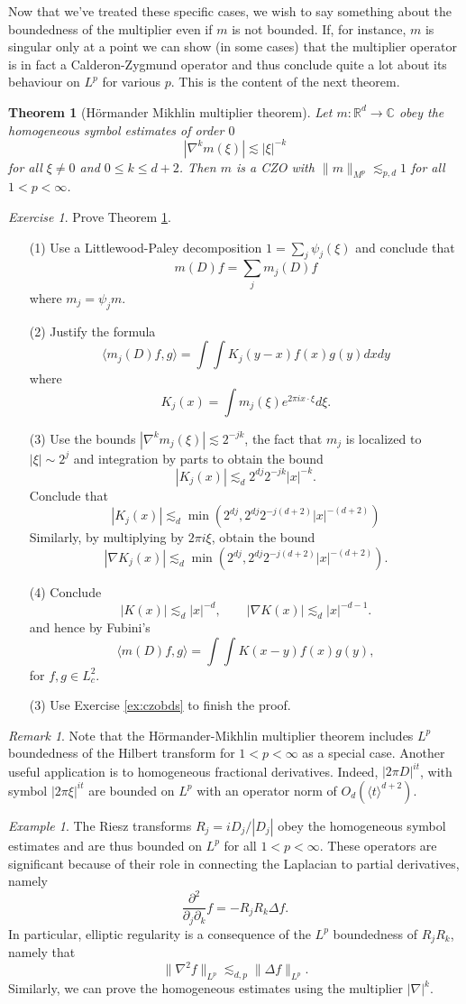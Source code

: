 \documentclass[11pt]{article}
\newtheorem{thm}{Theorem}
\theoremstyle{remark}
\newtheorem{exr}{Exercise}
\newtheorem*{ex}{Example}
\newtheorem*{rmk}{Remark}
\newcommand{\1}{\textbf{1}}
\newcommand{\lle}{\lesssim}
\def\norm#1{\| #1  \|}
\def\brac#1{\langle #1  \rangle}
\newcommand{\bbR}{\mathbb{R}}
\newcommand{\bbC}{\mathbb{C}}
\begin{document}
Now that we've treated these specific cases, we wish to say something about the boundedness of the multiplier even if $m$ is not bounded. If, for instance, $m$ is singular only at a point we can show (in some cases) that the multiplier operator is in fact a Calderon-Zygmund operator and thus conclude quite a lot about its behaviour on $L^p$ for various $p$. This is the content of the next theorem.
\begin{thm}[H\"ormander Mikhlin multiplier theorem]
Let $m: \bbR^d \to \bbC$ obey the homogeneous symbol estimates of order $0$
\[
|\nabla^k m(\xi)| \lle |\xi|^{-k}
\]
for all $\xi \neq 0$ and $0 \leq k \leq d+2$. Then $m$ is a CZO with $\|m\|_{M^p} \lle_{p,d} 1$ for all $1 < p < \infty$.
\label{thm:hmmult}
\end{thm}
\begin{exr}
Prove Theorem \ref{thm:hmmult}.
\begin{enumerate}
\item[(1)] Use a Littlewood-Paley decomposition $1 = \sum_j \psi_j(\xi)$ and conclude that
\[
m(D) f = \sum_{j} m_j(D) f
\]
where $m_j = \psi_j m$.
\item[(2)] Justify the formula
\[
\brac{m_j(D)f,g} = \int \int K_j(y-x) f(x) g(y) dx dy
\]
where
\[
K_j(x) = \int m_j(\xi) e^{2 \pi i x \cdot \xi} d\xi.
\]
\item[(3)] Use the bounds $|\nabla^k m_j(\xi)|\lle 2^{-jk}$, the fact that $m_j$ is localized to $|\xi| \sim 2^j$ and integration by parts to obtain the bound
\[
|K_j(x)| \lle_d 2^{dj} 2^{-jk} |x|^{-k}.
\]
Conclude that
\[
| K_j(x)| \lle_d \min(2^{dj}, 2^{dj}2^{-j(d+2)} |x|^{-(d+2)})
\]
Similarly, by multiplying by $2 \pi i \xi$, obtain the bound
\[
|\nabla K_j(x)| \lle_d \min(2^{dj}, 2^{dj}2^{-j(d+2)} |x|^{-(d+2)}).
\]
\item[(4)] Conclude
\[
|K(x)| \lle_d |x|^{-d}, \qquad |\nabla K(x)| \lle_d |x|^{-d -1}.
\]
and hence by Fubini's
\[
\brac{m(D)f, g} = \int \int K(x-y) f(x) g(y),
\]
for $f, g \in L^2_c$.
\item[(3)] Use Exercise \ref{ex:czobds} to finish the proof.
\end{enumerate}
\end{exr}
\begin{rmk}
Note that the H\"ormander-Mikhlin multiplier theorem includes $L^p$ boundedness of the Hilbert transform for $1< p < \infty$ as a special case. Another useful application is to homogeneous fractional derivatives. Indeed, $|2 \pi D|^{it}$, with symbol $|2 \pi \xi|^{it}$ are bounded on $L^p$ with an operator norm of $O_d(\brac{t}^{d+2})$.
\end{rmk}
\begin{ex}
The Riesz transforms $R_j = i D_j / |D_j|$ obey the homogeneous symbol estimates and are thus bounded on $L^p$ for all $1 < p < \infty$. These operators are significant because of their role in connecting the Laplacian to partial derivatives, namely
\[
\frac{\partial^{2}}{\partial_j \partial_k} f = - R_j R_k \Delta f.
\]
In particular, elliptic regularity is a consequence of the $L^p$ boundedness of $R_j R_k$, namely that
\[
\norm{\nabla^2 f}_{L^p} \lle_{d,p} \norm{\Delta f}_{L^p}.
\]
Similarly, we can prove the homogeneous estimates using the multiplier $|\nabla|^k$.
\end{ex}
\end{document}
